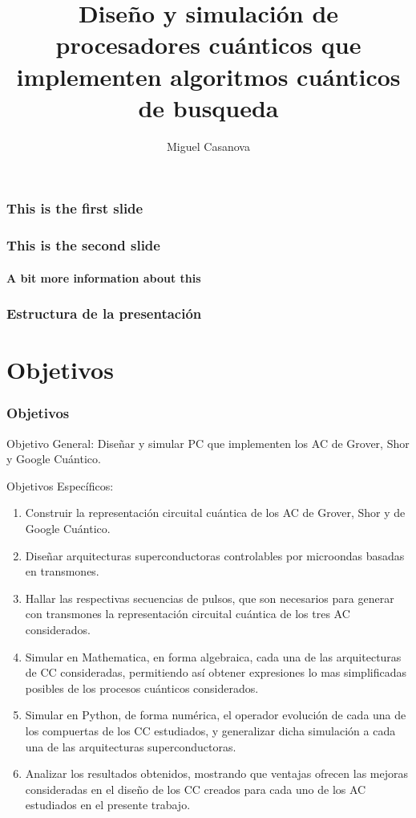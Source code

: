 \documentclass[xetex,mathserif,serif]{beamer}
\title[Simulación de procesadores cuánticos] %
{Diseño y simulación de procesadores cuánticos que implementen algoritmos cuánticos de busqueda}
\author[M. Casanova] %
{Miguel Casanova}
\institute[Universidad Simón Bolívar] %
{
  Coordinación de Tecnología e Ingeniería Electrónica\\
  Universidad Simón Bolívar
}
\begin{document}
\frame{\titlepage}

  \begin{frame}
    \frametitle{This is the first slide}
  \end{frame}
  \begin{frame}
    \frametitle{This is the second slide}
    \framesubtitle{A bit more information about this}
  \end{frame}

\begin{frame}
\frametitle{Estructura de la presentación}
\tableofcontents
\end{frame}

\section{Objetivos}
\begin{frame}
    \frametitle{Objetivos}

    Objetivo General:
     Diseñar y simular PC que implementen los AC de Grover, Shor y Google
    Cuántico.

    Objetivos Específicos:
    \begin{enumerate}
        \item Construir la representación circuital cuántica de los AC de Grover, Shor y de Google Cuántico.
        \item Diseñar arquitecturas superconductoras controlables por microondas basadas en transmones.
        \item Hallar las respectivas secuencias de pulsos, que son necesarios para generar con transmones la representación circuital cuántica de los tres AC considerados.
        \item Simular en Mathematica, en forma algebraica, cada una de las arquitecturas de CC consideradas, permitiendo así obtener expresiones lo mas simplificadas posibles de los procesos cuánticos considerados.
        \item Simular en Python, de forma numérica, el operador evolución de cada una de los compuertas de los CC estudiados, y generalizar dicha simulación a cada una de las arquitecturas superconductoras.
        \item Analizar los resultados obtenidos, mostrando que ventajas ofrecen las mejoras consideradas en el diseño de los CC creados para cada uno de los AC estudiados en el presente trabajo.
    \end{enumerate}

\end{frame}
\end{document}

